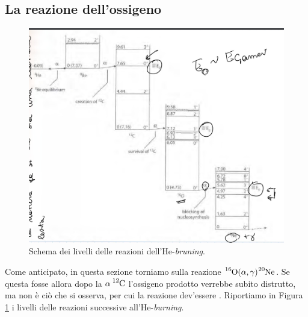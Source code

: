 \subsection{La reazione dell'ossigeno}
\begin{figure}[h]
	\centering
	\includegraphics[scale=0.5]{Immagini/0428_reac.png}
	\caption{Schema dei livelli delle reazioni dell'He-\textit{bruning}.}
	\label{0428_scheme}
\end{figure}
\noindent Come anticipato, in questa sezione torniamo sulla reazione $\ce{^{16}O(\alpha,\gamma)\ce{^{20}Ne}}$. Se questa fosse  allora dopo la $\alpha\,\ce{^{12}C}$ l'ossigeno prodotto verrebbe subito distrutto, ma non è ciò che si osserva, per cui la reazione dev'essere . Riportiamo in Figura \ref{0428_scheme} i livelli delle reazioni successive all'He-\textit{burning}.

